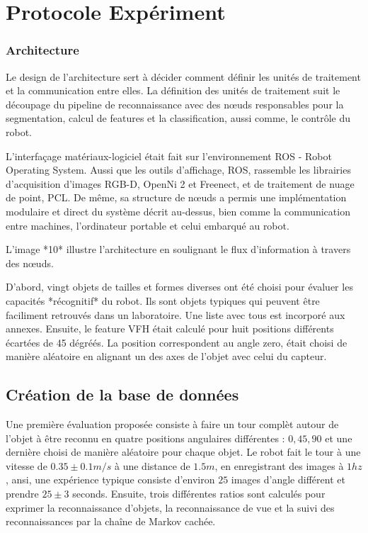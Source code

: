 \section {Protocole Expériment}


\subsubsection{Architecture}

Le design de l'architecture sert à décider comment définir les unités de traitement et la communication entre elles. La définition des unités de traitement suit le découpage du pipeline de reconnaissance avec des nœuds responsables pour la segmentation, calcul de features et la classification, aussi comme, le contrôle du robot.

L'interfaçage matériaux-logiciel était fait sur l'environnement ROS -
Robot Operating System. Aussi que les outils d'affichage, ROS, 
rassemble les librairies d'acquisition d'images RGB-D, OpenNi 2 et Freenect, et de traitement de nuage de point, PCL.
De même, sa structure de nœuds a permis une implémentation modulaire et direct du
système décrit au-dessus, bien comme la communication entre machines, l'ordinateur portable et celui embarqué au robot.

L'image *10* illustre l'architecture en soulignant le flux d'information à travers des nœuds.


D'abord, vingt objets de tailles et formes diverses ont été choisi pour évaluer les capacités *récognitif* du robot. Ils sont objets typiques qui peuvent être faciliment retrouvés dans un laboratoire. Une liste avec tous est incorporé aux annexes. Ensuite, le feature VFH était calculé pour huit positions différents écartées de 45 dégréés. La position correspondent au angle zero, était choisi de manière aléatoire en alignant un des axes de l'objet avec celui du capteur. 

\begin{figure}[H]
\end{figure}

\subsection {Création de la base de données}
Une première évaluation proposée consiste à faire un tour complèt autour de l'objet à être reconnu en quatre positions angulaires différentes : $0, 45, 90$ et une dernière choisi de manière aléatoire pour chaque objet. Le robot fait le tour à une vitesse de $0.35 \pm 0.1 m/s$ à une distance de $1.5m$, en enregistrant des images à $1hz$, ansi, une expérience typique consiste d'environ $25$  images d'angle différent et prendre $25 \pm 3$ seconds. Ensuite, trois différentes ratios sont calculés pour exprimer la reconnaissance d'objets, la reconnaissance de vue et la suivi des reconnaissances par la chaîne de Markov cachée.


